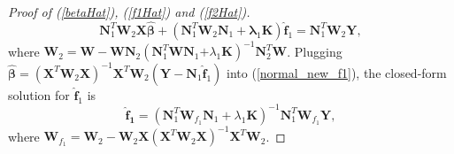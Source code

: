 \documentclass[review]{elsarticle}
\begin{document}
\begin{proof} [Proof of (\ref{betaHat}),  (\ref{f1Hat}) and  (\ref{f2Hat})]
\begin{equation}
\boldsymbol N_1^T  \boldsymbol W_2
\boldsymbol X \boldsymbol {\hat \beta} 
+ 
(\boldsymbol N_1^T  \boldsymbol W_2
\boldsymbol N_1 + \boldsymbol \lambda_1 \boldsymbol K)
\boldsymbol {\hat f}_1
=
\boldsymbol N_1^T  \boldsymbol W_2
\boldsymbol Y,
\end{equation}
where 
$\boldsymbol W_2 =
 \boldsymbol W 
 -
\boldsymbol W \boldsymbol N_2 
 (\boldsymbol N_1^T  \boldsymbol W \boldsymbol N_1 \boldsymbol 
 + \lambda_1 \boldsymbol K)^{-1} 
 \boldsymbol N_2^T  \boldsymbol W$.
Plugging $ \boldsymbol {\hat \beta} = 
(\boldsymbol X^T  \boldsymbol W_2\boldsymbol X)^{-1}  
\boldsymbol X^T  \boldsymbol W_2 (\boldsymbol Y
  - \boldsymbol N_1 \boldsymbol {\hat f}_1) 
$
into  (\ref{normal_new_f1}), the closed-form solution for $ \boldsymbol {\hat f}_1$ is
$$
 \boldsymbol {\hat f_1} 
 =
  (\boldsymbol N_1^T 
\boldsymbol W_{f_1}  \boldsymbol N_1
  + \lambda_1 \boldsymbol K)^{-1}  \boldsymbol N_1^T \boldsymbol W_{f_1} \boldsymbol Y,
  $$
 where
 $\boldsymbol W_{f_1}  =  \boldsymbol W_2 - \boldsymbol W_2\boldsymbol X(\boldsymbol X^T  \boldsymbol W_2\boldsymbol X)^{-1}  \boldsymbol X^T  \boldsymbol W_2$.  
 \end{proof}

%
%
\end{document}
